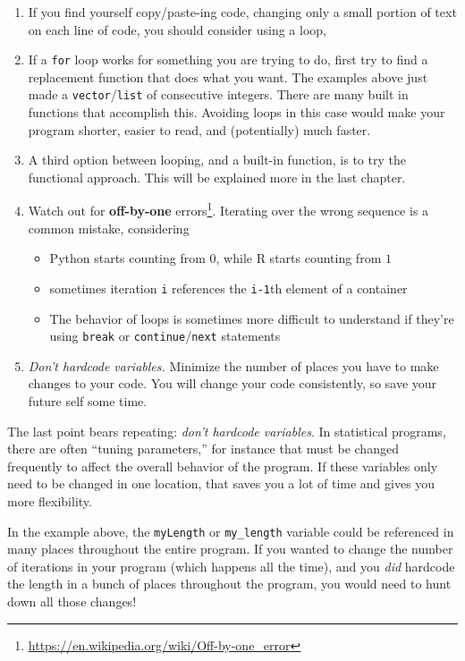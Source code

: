 \documentclass[
  12pt,
]{krantz}
\providecommand{\tightlist}{%
  \setlength{\itemsep}{0pt}\setlength{\parskip}{0pt}}
\renewcommand{\href}[2]{#2\footnote{\url{#1}}}
\begin{document}
\begin{enumerate}
\def\labelenumi{\arabic{enumi}.}
\tightlist
\item
  If you find yourself copy/paste-ing code, changing only a small portion of text on each line of code, you should consider using a loop,
\item
  If a \texttt{for} loop works for something you are trying to do, first try to find a replacement function that does what you want. The examples above just made a \texttt{vector}/\texttt{list} of consecutive integers. There are many built in functions that accomplish this. Avoiding loops in this case would make your program shorter, easier to read, and (potentially) much faster.
\item
  A third option between looping, and a built-in function, is to try the functional approach. This will be explained more in the last chapter.
\item
  Watch out for \href{https://en.wikipedia.org/wiki/Off-by-one_error}{\textbf{off-by-one} errors}. Iterating over the wrong sequence is a common mistake, considering

  \begin{itemize}
  \tightlist
  \item
    Python starts counting from \(0\), while R starts counting from \(1\)
  \item
    sometimes iteration \texttt{i} references the \texttt{i-1}th element of a container
  \item
    The behavior of loops is sometimes more difficult to understand if they're using \texttt{break} or \texttt{continue}/\texttt{next} statements
  \end{itemize}
\item
  \emph{Don't hardcode variables.} Minimize the number of places you have to make changes to your code. You will change your code consistently, so save your future self some time.
\end{enumerate}

The last point bears repeating: \emph{don't hardcode variables}. In statistical programs, there are often ``tuning parameters,'' for instance that must be changed frequently to affect the overall behavior of the program. If these variables only need to be changed in one location, that saves you a lot of time and gives you more flexibility.

In the example above, the \texttt{myLength} or \texttt{my\_length} variable could be referenced in many places throughout the entire program. If you wanted to change the number of iterations in your program (which happens all the time), and you \emph{did} hardcode the length in a bunch of places throughout the program, you would need to hunt down all those changes!
\end{document}
